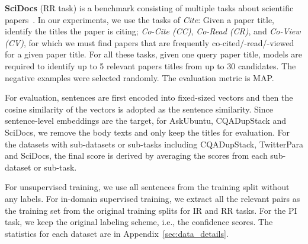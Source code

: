 \documentclass[11pt,a4paper]{article}
\begin{document}
\textbf{SciDocs} (RR task) is a benchmark consisting of multiple tasks about scientific papers~\citep{DBLP:conf/acl/CohanFBDW20}. In our experiments, we use the tasks of \textit{Cite}: Given a paper title, identify the titles the paper is citing;  \textit{Co-Cite (CC)}, \textit{Co-Read (CR)}, and \textit{Co-View (CV)}, for which we must find papers that are frequently co-cited/-read/-viewed for a given paper title. For all these tasks, given one query paper title, models are required to identify up to 5 relevant papers titles from up to 30 candidates. The negative examples were selected randomly. The evaluation metric is MAP.

For evaluation, sentences are first encoded into fixed-sized vectors and then the cosine similarity of the vectors is adopted as the sentence similarity. Since sentence-level embeddings are the target, for AskUbuntu, CQADupStack and SciDocs, we remove the body texts and only keep the titles for evaluation. For the datasets with sub-datasets or sub-tasks including CQADupStack, TwitterPara and SciDocs, the final score is derived by averaging the scores from each sub-dataset or sub-task.

For unsupervised training, we use all sentences from the training split without any labels. For in-domain supervised training, we extract all the relevant pairs as the training set from the original training splits for IR and RR tasks. For the PI task, we keep the original labeling scheme, i.e., the confidence scores. The statistics for each dataset are in Appendix~\ref{sec:data_details}.
\end{document}
